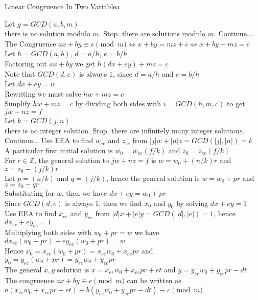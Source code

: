 \documentclass[12pt,oneside,a4paper]{article}
\begin{document}
\begin{algorithm}[H]
	\caption{Linear Congruence In Two Variablea}
	\DontPrintSemicolon
	\SetAlgoLined
	
	\BlankLine
	
	Let $g=GCD(a,b,m)$ \\
	 { there is no solution modulo $m$. Stop. }
	 { there are solutions modulo $m$. Continue... }
	The Congruence $ax+by \equiv c \pmod{m} \Longleftrightarrow x+by=mz+c \Longleftrightarrow x+by+mz=c$ \\
	Let $h=GCD(a,b)$, $d=a/h$, $e=b/h$ \\
	Factoring out $ax+by$ we get $h(dx+ey)+mz=c$ \\
	Note that $GCD(d,e)$ is always $1$, since $d=a/h$ and $e=b/h$ \\
	Let $dx+ey=w$ \\
	Rewriting we must solve $hw+mz=c$ \\
	Simplify $hw+mz=c$ by dividing both sides with $i=GCD(h,m,c)$ to get $jw+nz=f$ \\
	Let $k=GCD(j,n)$ \\
	 { there is no integer solution. Stop. }
	 { there are infinitely many integer solutions. Continue... }
	Use EEA to find $w_{ee}$ and $z_{ee}$ from $|j|w + |n|z = GCD(|j|, |n|) = k$ \\
	A particular first initial solution is $w_0 = w_{ee}(f/k)$ and $z_0 = z_{ee}(f/k)$ \\
	For $r \in \mathbb{Z}$, the general solution to $jw+nz=f$ is $w = w_0 + (n/k)r$ and $z = z_0 - (j/k)r$ \\
	Let $p=(n/k)$ and $q=(j/k)$, hence the general solution is $w = w_0 + pr$ and $z = z_0 - qr$ \\
	Substituting for $w$, then we have  $dx+ey = w_0+pr$ \\
	Since $GCD(d,e)$ is always $1$, then we find $x_0$ and $y_0$ by solving $dx+ey=1$ \\
	Use EEA to find $x_{ee}$ and $y_{ee}$ from $|d|x + |e|y = GCD(|d|, |e|) = 1$, hence $dx_{ee}+ey_{ee} = 1$ \\
	Multiplying both sides with $w_0+pr = w$ we have $dx_{ee}(w_0+pr)+ey_{ee}(w_0+pr) = w$ \\
	Hence $x_0 = x_{ee}(w_0+pr) = x_{ee}w_0+x_{ee}pr$ and $y_0 = y_{ee}(w_0+pr) = y_{ee}w_0+y_{ee}pr$ \\
	The general $x,y$ solution is $x = x_{ee}w_0+x_{ee}pr + et$ and $y = y_{ee}w_0+y_{ee}pr - dt$ \\
	The congruence $ax+by \equiv c \pmod{m}$ can be written as $a(x_{ee}w_0 + x_{ee}pr + et) + b(y_{ee}w_0 + y_{ee}pr - dt) \equiv c \pmod{m}$ \\
	
\end{algorithm}
\end{document}
